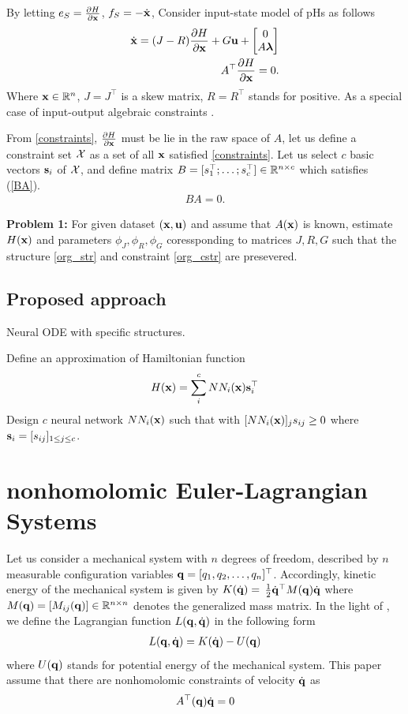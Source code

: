 \documentclass[letterpaper, 10 pt, conference]{ieeeconf}
\begin{document}
By letting
$e_S = \frac{{\partial} H}{{\partial} {\mathbf x}}$, $f_S = -\dot{{\mathbf x}}$,
Consider input-state model of pHs as follows
\begin{align}
    \dot {{\mathbf x}} = (J - R)\frac{{\partial} H}{{\partial} {\mathbf x}} + G {\mathbf u} + 
    \begin{bmatrix} 0 \\ A \boldsymbol\lambda \\ \end{bmatrix} \label{org_str}   
    \\
    A^\top \frac{{\partial} H}{{\partial} {\mathbf x}} = 0.
    \label{org_cstr}
\end{align}
Where ${\mathbf x} \in {\mathbb R}^n$, $J = J^\top$ is a skew matrix, $R = R^\top$ stands for positive.
As a special case of input-output algebraic constraints  \cite[Chapter 8]{schaftPortHamiltonianSystemsTheory2014}.

From \eqref{constraints}, $\frac{{\partial} H}{{\partial} {\mathbf x}}$ must be lie in the raw space of $A$, let us define a constraint set ${\mathcal X}$ as a set of all ${\mathbf x}$ satisfied \eqref{constraints}.
Let us select $c$ basic vectors ${\mathbf s}_i$ of ${\mathcal X}$, and define  matrix
$B = [s_1^\top;\dots;s_c^\top] \in {\mathbb R}^{n\times c}$ which satisfies (\ref{BA}).
\begin{align}
    B A = 0.
    \label{BA}
\end{align}

{\bf Problem 1:} For given dataset $({\mathbf x}, {\mathbf u})$ and assume that $A({\mathbf x})$ is known, estimate $H({\mathbf x})$ and parameters $\phi_J, \phi_R, \phi_G$ coressponding to matrices $J,R,G$ such that the structure \eqref{org_str} and constraint \eqref{org_cstr} are presevered.


\subsection{Proposed approach}

Neural ODE with specific structures.

Define an approximation of Hamiltonian function
\begin{align}
    H({\mathbf x}) = \sum_i^c NN_i({\mathbf x}) {\mathbf s}_i^\top
\end{align}
Design $c$ neural network $NN_i({\mathbf x})$ such that
with $[NN_i({\mathbf x})]_j s_{ij} \geq 0$ where ${\mathbf s}_i = [s_{ij}]_{1\leq j\leq c}$.

\section{nonhomolomic Euler-Lagrangian Systems}
Let us consider a mechanical system with $n$ degrees of freedom, described by $n$ measurable configuration variables ${\mathbf q} = [q_1,q_2,\dots,q_n]^\top$. Accordingly, kinetic energy of the mechanical system is given by $K(\dot{{\mathbf q}}) = $
$\frac{1}{2} \dot{{\mathbf q}}^\top M({\mathbf q}) \dot{{\mathbf q}}$ where $M({\mathbf q}) = [M_{ij}({\mathbf q})] \in {\mathbb R}^{n \times n}$ denotes the generalized mass matrix. In the light of \cite{}, we define the Lagrangian function $L({\mathbf q},\dot {{\mathbf q}})$ in the following form
\begin{align}
    L({\mathbf q},\dot {{\mathbf q}}) = K(\dot{{\mathbf q}}) - U({\mathbf q})
\end{align}
where $U({\mathbf q})$ stands for potential energy of the mechanical system. This paper assume that there are nonhomolomic constraints of velocity $\dot {{\mathbf q}}$ as 
\begin{align}
    A^\top({\mathbf q}) \dot{{\mathbf q}} = 0
\end{align}
\end{document}
